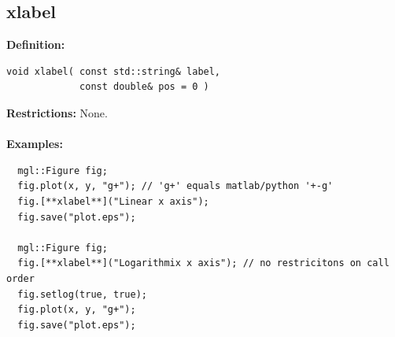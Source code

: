 \documentclass[a4paper]{article}
\newcommand{\command}[1]{\subsection{#1}}
\begin{document}
\newpage
\command{xlabel}

\textbf{Definition:}
\begin{lstlisting}
void xlabel( const std::string& label, 
             const double& pos = 0 )
\end{lstlisting}
%
\textbf{Restrictions:} None. \\ \\
%
\textbf{Examples:}
\begin{lstlisting}
  mgl::Figure fig;
  fig.plot(x, y, "g+"); // 'g+' equals matlab/python '+-g'
  fig.[**xlabel**]("Linear x axis");
  fig.save("plot.eps");

  mgl::Figure fig;
  fig.[**xlabel**]("Logarithmix x axis"); // no restricitons on call order
  fig.setlog(true, true);
  fig.plot(x, y, "g+");
  fig.save("plot.eps");
\end{lstlisting}
\end{document}
